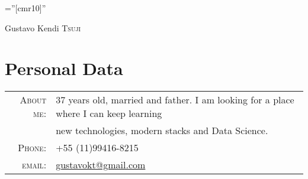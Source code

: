 \documentclass[a4paper,10pt]{article}
\begin{document}

\pagestyle{empty} %

\font\fb=''[cmr10]'' %

\par{\centering
    {\Huge Gustavo Kendi \textsc{Tsuji}
  }\bigskip\par}

\section{Personal Data}

\begin{tabular}{rl}
  \textsc{About me:}   & 37 years old, married and father. I am looking for a place where I can keep learning \\
    &new technologies, modern stacks and Data Science.\\
    \textsc{Phone:}     & +55 (11)99416-8215\\
    \textsc{email:}     & \href{mailto:gustavokt@gmail.com}{gustavokt@gmail.com}
\end{tabular}

\end{document}
